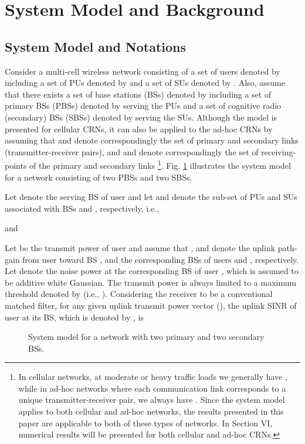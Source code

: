 \documentclass[journal,twoside]{IEEEtran}
\begin{document}
\section{System Model and Background}
	\label{sec:system_model}
	\subsection{System Model and Notations}
	Consider a multi-cell wireless network consisting of a set of  users denoted by  including a set of  PUs denoted by  and a set of  SUs denoted by . Also, assume that there exists a set of  base stations (BSs) denoted by  including a set of  primary BSs (PBSs) denoted by  serving the PUs and a set of  cognitive radio (secondary) BSs (SBSs) denoted by  serving the SUs. Although the model is presented for cellular CRNs, it can also be applied to the ad-hoc CRNs by assuming that  and  denote correspondingly the set of primary and secondary links (transmitter-receiver pairs), and  and  denote correspondingly the set of receiving-points of the primary and secondary links \footnote{In cellular networks, at moderate or heavy traffic loads we generally have \mbox{}, while in ad-hoc networks where each communication link corresponds to a unique transmitter-receiver pair, we always have . Since the system model applies to both cellular and ad-hoc networks, the results presented  in this paper are applicable to both of these types of networks. In Section VI, numerical results  will be presented for both cellular and ad-hoc CRNs.}.
	 Fig. \ref{fig:system_model} illustrates the system model for a network consisting of two PBSs and two SBSs.
	
	Let  denote the serving BS of user  and let  and  denote the sub-set of PUs and SUs associated with BSs  and , respectively, i.e.,
	
	and
	
	
	Let  be the transmit power of user  and assume that ,  and  denote the uplink path-gain from user  toward BS , and the corresponding BSs of users  and  , respectively. Let  denote the noise power at the corresponding BS of user , which is assumed to be additive white Gaussian. The transmit power  is always limited to a maximum threshold denoted by  (i.e., \mbox{}). Considering the receiver to be a conventional matched filter, for any given uplink transmit power vector  (), the uplink SINR of user  at its BS, which is denoted by , is
	
	
	

	\begin{figure}
		\centering
\setlength{\fboxrule}{0pt}
\caption{System model for a network with two primary and two secondary BSs.} \vspace{-10pt}
		\label{fig:system_model}
	\end{figure}
	
\end{document}
